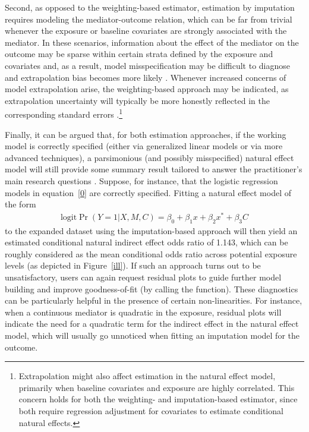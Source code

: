 \documentclass[nojss]{jss}
\begin{document}
\par Second, as opposed to the weighting-based estimator, estimation by imputation requires modeling the mediator-outcome relation, which can be far from trivial whenever the exposure or baseline covariates are strongly associated with the mediator. In these scenarios, information about the effect of the mediator on the outcome may be sparse within certain strata defined by the exposure and covariates and, as a result, model misspecification may be difficult to diagnose and extrapolation bias becomes more likely \citep{Vansteelandt2012f}. Whenever increased concerns of model extrapolation arise, the weighting-based approach may be indicated, as extrapolation uncertainty will typically be more honestly reflected in the corresponding standard errors \citep{Vansteelandt2012a}.\footnote{Extrapolation might also affect estimation in the natural effect model, primarily when baseline covariates and exposure are highly correlated. This concern holds for both the weighting- and imputation-based estimator, since both require regression adjustment for covariates to estimate conditional natural effects.}
\par Finally, it can be argued that, for both estimation approaches, if the working model is correctly specified (either via generalized linear models or via more advanced techniques), a parsimonious (and possibly misspecified) natural effect model will still provide some summary result tailored to answer the practitioner's main research questions \citep{Vansteelandt2012, Loeys2013a}. Suppose, for instance, that the logistic regression models in equation~\eqref{0} are correctly specified. Fitting a natural effect model of the form
\begin{align*}
\mbox{logit} \Pr(Y=1|X,M,C) = \beta_0 + \beta_1 x + \beta_2 x^* + \beta_3 C
\end{align*}
to the expanded dataset using the imputation-based approach will then yield an estimated conditional natural indirect effect odds ratio of 1.143, which can be roughly considered as the mean conditional odds ratio across potential exposure levels (as depicted in Figure~\ref{ill}). If such an approach turns out to be unsatisfactory, users can again request residual plots to guide further model building and improve goodness-of-fit (by calling the  function). These diagnostics can be particularly helpful in the presence of certain non-linearities. For instance, when a continuous mediator is quadratic in the exposure, residual plots will indicate the need for a quadratic term for the indirect effect in the natural effect model, which will usually go unnoticed when fitting an imputation model for the outcome. 
\end{document}
